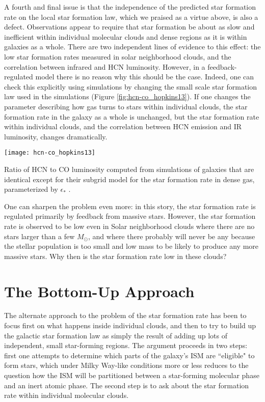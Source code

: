 A fourth and final issue is that the independence of the predicted star formation rate on the local star formation law, which we praised as a virtue above, is also a defect. Observations appear to require that star formation be about as slow and inefficient within individual molecular clouds and dense regions as it is within galaxies as a whole. There are two independent lines of evidence to this effect: the low star formation rates measured in solar neighborhood clouds, and the correlation between infrared and HCN luminosity. However, in a feedback-regulated model there is no reason why this should be the case. Indeed, one can check this explicitly using simulations by changing the small scale star formation law used in the simulations (Figure \ref{fig:hcn-co_hopkins13}). If one changes the parameter describing how gas turns to stars within individual clouds, the star formation rate in the galaxy as a whole is unchanged, but the star formation rate within individual clouds, and the correlation between HCN emission and IR luminosity, changes dramatically.
\begin{marginfigure}
\texttt{[image: hcn-co\_hopkins13]}
\caption[Ratio of HCN to CO luminosity as a function of subgrid star formation recipe]{
\label{fig:hcn-co_hopkins13}
Ratio of HCN to CO luminosity computed from simulations of galaxies that are identical except for their subgrid model for the star formation rate in dense gas, parameterized by $\epsilon_*$ \citet{hopkins13c}.
}
\end{marginfigure}

One can sharpen the problem even more: in this story, the star formation rate is regulated primarily by feedback from massive stars. However, the star formation rate is observed to be low even in Solar neighborhood clouds where there are no stars larger than a few $M_\odot$, and where there probably will never be any because the stellar population is too small and low mass to be likely to produce any more massive stars. Why then is the star formation rate low in these clouds?

\section{The Bottom-Up Approach}

The alternate approach to the problem of the star formation rate has been to focus first on what happens inside individual clouds, and then to try to build up the galactic star formation law as simply the result of adding up lots of independent, small star-forming regions. The argument proceeds in two steps: first one attempts to determine which parts of the galaxy's ISM are ``eligible" to form stars, which under Milky Way-like conditions more or less reduces to the question how the ISM will be partitioned between a star-forming molecular phase and an inert atomic phase. The second step is to ask about the star formation rate within individual molecular clouds.

